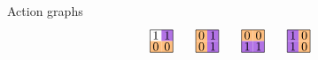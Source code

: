 \documentclass[8pt, handout]{beamer}
\begin{document}
\begin{frame}{Action graphs}
\[\begin{tikzpicture}[scale=.65]
\begin{scope}[shift={(6,0)}]
      \path[fill=actPurple] (.5,.5) rectangle ++(.5,.5);
      \path[fill=actOrange] (0,0) rectangle ++(.5,.5);
      \path[fill=actOrange] (.5,0) rectangle ++(.5,.5);
      \draw (0,0) rectangle (1,1);
      \draw (.25,.75) node{$1$}; \draw (.75,.75) node{$1$};
      \draw (.25,.25) node{$0$}; \draw (.75,.25) node{$0$};
    \end{scope}
    \begin{scope}[shift={(8,0)}]
      \path[fill=actOrange] (0,.5) rectangle ++(.5,.5); 
      \path[fill=actPurple] (.5,.5) rectangle ++(.5,.5);
      \path[fill=actOrange] (0,0) rectangle ++(.5,.5);
      \path[fill=actPurple] (.5,0) rectangle ++(.5,.5);
      \draw (0,0) rectangle (1,1);
      \draw (.25,.75) node{$0$}; \draw (.75,.75) node{$1$};
      \draw (.25,.25) node{$0$}; \draw (.75,.25) node{$1$};
    \end{scope}
    \begin{scope}[shift={(10,0)}]
      \path[fill=actOrange] (0,.5) rectangle ++(.5,.5); 
      \path[fill=actOrange] (.5,.5) rectangle ++(.5,.5);
      \path[fill=actPurple] (0,0) rectangle ++(.5,.5);
      \path[fill=actPurple] (.5,0) rectangle ++(.5,.5);
      \draw (0,0) rectangle (1,1);
      \draw (.25,.75) node{$0$}; \draw (.75,.75) node{$0$};
        \draw (.25,.25) node{$1$}; \draw (.75,.25) node{$1$};
    \end{scope}
    \begin{scope}[shift={(12,0)}]
      \path[fill=actPurple] (0,.5) rectangle ++(.5,.5); 
      \path[fill=actOrange] (.5,.5) rectangle ++(.5,.5);
      \path[fill=actPurple] (0,0) rectangle ++(.5,.5);
      \path[fill=actOrange] (.5,0) rectangle ++(.5,.5);
      \draw (0,0) rectangle (1,1);
      \draw (.25,.75) node{$1$}; \draw (.75,.75) node{$0$};
      \draw (.25,.25) node{$1$}; \draw (.75,.25) node{$0$};
    \end{scope}
  \end{tikzpicture}
  \]


\end{frame}
\end{document}
